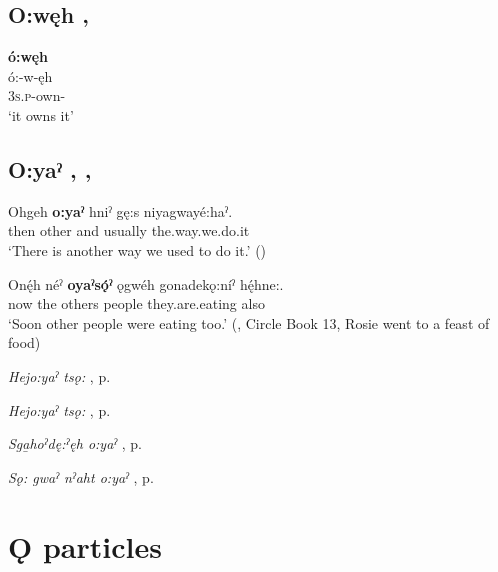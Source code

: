 \subsection*{\textbf{O:węh} , } \label{p:[o:węh]}

\ea
\label{ex:opart52} \textbf{ó:węh}\\
\gll ó:-w-ęh\\
\textsc{3s.p}-own-{\stative}\\
\glt ‘it owns it’
\z


\subsection*{\textbf{O:yaˀ} , , } \label{p:[o:yaˀ]}

\ea
\label{ex:opart53}
\gll Ohgeh \textbf{o:yaˀ} hniˀ gę:s niyagwayé:haˀ.\\
then other and usually the.way.we.do.it\\
\glt ‘There is another way we used to do it.’ (\cite{mithun_how_1980})
\z

\ea
\label{ex:opart54}
\gll Onę́h néˀ \textbf{oyaˀsǫ́ˀ} ǫgwéh gonadekǫ:níˀ hę́hne:.\\
now the others people they.are.eating also\\
\glt ‘Soon other people were eating too.’ (\cite{keye_circle_2016}, Circle Book 13, Rosie went to a feast of food)
\z

\begin{CayugaRelated}
\item \textit{Hejo:yaˀ tsǫ:} , p. \pageref{p:[hejo:yaˀ tsǫ:] ‘another thing again’}\\
\item \textit{Hejo:yaˀ tsǫ:} , p. \pageref{p:[hejo:yaˀ tsǫ:] ‘elsewhere’}\\
\item \textit{Sga̱hoˀdę:ˀęh o:yaˀ} , p. \pageref{p:[sgahoˀdę:ˀęh o:yaˀ]}\\
\item \textit{Sǫ: gwaˀ nˀaht o:yaˀ} , p. \pageref{p:[sǫ: gwaˀ nˀaht o:yaˀ]}
\end{CayugaRelated}

\section{Ǫ particles}


